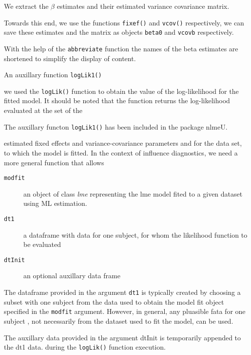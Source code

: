 \documentclass[a4paper,12pt]{article}
\begin{document}
We extract the \textbf{$\beta$} estimates and their estimated variance covariance matrix.

Towards this end, we use the functions \texttt{fixef()} and \texttt{vcov()} respectively, we can save these estimates and the matrix as objects \texttt{beta0} and 
\texttt{vcovb} respectively.

With the help of the \texttt{abbreviate} function the names of the beta estimates are shortened to simplify the display of content.

An auxillary function \texttt{logLik1()}

we used the \texttt{logLik()} function to obtain the value of the log-likelihood for the fitted model.
It should be noted that the function returns the log-likelihood evaluated at the set of the


The auxillary functon \texttt{logLik1()} has been included in the package nlmeU.

estimated fixed effects and variance-covariance parameters and for the data set, to which the model
is fitted. In the context of influence diagnostics, we need a more general function that allows




\begin{description}
\item[ \texttt{modfit} ] an object of class \textit{lme} representing the lme model fited to a given dataset using ML estimation.
\item[ \texttt{dt1}] a dataframe with data for one subject, for whom the likelihood function to be evaluated
\item[ \texttt{dtInit }] an optional auxillary data frame
\end{description}


The dataframe provided in the argument \texttt{dt1} is typically created by choosing a subset with one subject from the data used to obtain the model fit object specified in the \texttt{modfit} argument.
However, in general, any pluasible fata for one subject , not necessarily from the dataset used to fit the model, can be used.


The auxillary data provided in the argument dtInit is temporarily appended to the dt1 data. during the \texttt{logLik()} function execution.
\end{document}
